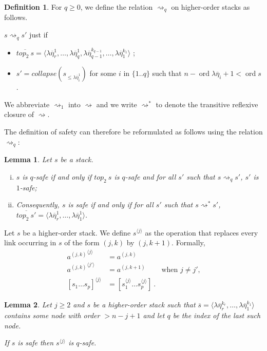 \documentclass{article}
\newcommand{\ord}{\mathop{\mathrm{ord}}}
\newcommand{\prefixof}{\leqslant}
\newtheorem{lemma}{Lemma}[section]
\theoremstyle{remark}
\theoremstyle{definition}
\newtheorem{definition}{Definition}[section]
\newcommand\orddec\overline
\newcommand\saferel\rightsquigarrow
\begin{document}
\begin{definition}
For $q\geq 0$, we define the relation $\saferel_q$ on higher-order
stacks as follows.

$s \saferel_q s'$ just if
\begin{itemize}
\item $\orddec{top_2\ s} = \langle \lambda \overline{\eta}_r^1, \ldots , \lambda
\overline{\eta}_q^1, \lambda \overline{\eta}_{q-1}^{k_{q-1}}, \ldots
, \lambda \overline{\eta}_1^{k_1} \rangle$ ;

\item $s' = collapse (s_{\prefixof \lambda \overline{\eta}_i^1})$ for some $i$ in
$\{1..q\}$ such that $n - \ord{\lambda \overline{\eta}_i} + 1 <
\ord{s}$.
\end{itemize}

We abbreviate $\saferel_1$ into $\saferel$ and we write $\saferel^*$ to denote the transitive reflexive closure of $\saferel$.

\end{definition}
The definition of safety can therefore be reformulated as follows
using the relation $\saferel_q$:
\begin{lemma}
\label{lem:qsafety_equivdef}
 Let $s$ be a stack.
\begin{enumerate}[i.]
  \item $s$ is $q$-safe if and only if $top_2\ s$ is $q$-safe and for all $s'$ such that $s \saferel_q s'$, $s'$ is $1$-safe;

  \item Consequently, $s$ is safe if and only if for all $s'$ such that $s
  \saferel^*
s'$, $\orddec{top_2\ s'} = \langle \lambda \overline{\eta}_r^1,
\ldots , \lambda \overline{\eta}_1^{1} \rangle$.
\end{enumerate}
\end{lemma}

Let $s$ be a higher-order stack. We define $s^{\langle j \rangle}$ as the operation that replaces
every link occurring in $s$ of the form $(j,k)$ by $(j,k+1)$. Formally,
\begin{align*}
{a^{(j,k)}}^{\langle j \rangle} &= a^{(j,k)}   \\
{a^{(j,k)}}^{\langle j' \rangle} &= a^{(j,k+1)} &   \mbox{when $j\neq j'$,}\\
[s_1 \ldots s_p]^{\langle j \rangle} &= [s_1^{\langle j \rangle} \ldots s_p^{\langle j \rangle}] \ .
\end{align*}

\begin{lemma}
\label{lem:incrk_qsafe}
 Let $j\geq2$ and $s$ be a higher-order stack
such that $\orddec{s} = \langle \lambda \overline{\eta}_r^{k_r},
\ldots , \lambda \overline{\eta}_1^{k_1} \rangle$ contains some node
with order $>n-j+1$ and let $q$ be the index of the last such node.

If $s$ is safe then $s^{\langle j \rangle}$ is $q$-safe.
\end{lemma}
\end{document}
